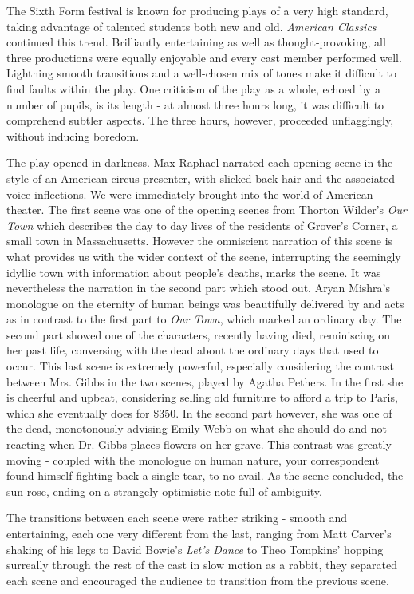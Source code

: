 The Sixth Form festival is known for producing plays of a very high
standard, taking advantage of talented students both new and old.
\textit{American Classics} continued this trend. Brilliantly entertaining
as well as thought-provoking, all three productions were equally
enjoyable and every cast member performed well. Lightning smooth
transitions and a well-chosen mix of tones make it difficult to find
faults within the play. One criticism of the play as a whole, echoed by
a number of pupils, is its length - at almost three hours long, it was
difficult to comprehend subtler aspects. The three hours, however,
proceeded unflaggingly, without inducing boredom.

The play opened in darkness. Max Raphael narrated each opening scene in
the style of an American circus presenter, with slicked back hair and
the associated voice inflections. We were immediately brought into the
world of American theater. The first scene was one of the opening scenes
from Thorton Wilder's \textit{Our Town} which describes the day to day
lives of the residents of Grover's Corner, a small town in
Massachusetts. However the omniscient narration of this scene is what
provides us with the wider context of the scene, interrupting the
seemingly idyllic town with information about people's deaths, marks the
scene. It was nevertheless the narration in the second part which stood
out. Aryan Mishra's monologue on the eternity of human beings was
beautifully delivered by and acts as in contrast to the first part to
\textit{Our Town}, which marked an ordinary day. The second part showed
one of the characters, recently having died, reminiscing on her past
life, conversing with the dead about the ordinary days that used to
occur. This last scene is extremely powerful, especially considering the
contrast between Mrs. Gibbs in the two scenes, played by Agatha Pethers.
In the first she is cheerful and upbeat, considering selling old
furniture to afford a trip to Paris, which she eventually does for
\$350. In the second part however, she was one of the dead, monotonously
advising Emily Webb on what she should do and not reacting when Dr.
Gibbs places flowers on her grave. This contrast was greatly moving -
coupled with the monologue on human nature, your correspondent found
himself fighting back a single tear, to no avail. As the scene
concluded, the sun rose, ending on a strangely optimistic note full of
ambiguity.

The transitions between each scene were rather striking - smooth and
entertaining, each one very different from the last, ranging from Matt
Carver's shaking of his legs to David Bowie's \textit{Let's Dance} to Theo
Tompkins' hopping surreally through the rest of the cast in slow motion
as a rabbit, they separated each scene and encouraged the audience to
transition from the previous scene.

